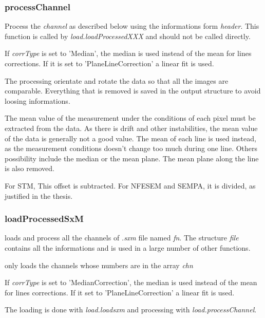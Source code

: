 \subsubsection{processChannel}

\bdf
{} Process the \emph{channel} as described below using the informations form \emph{header}. This function is called by \emph{load.loadProcessedXXX} and should not be called directly.

 If \emph{corrType} is set to 'Median', the median is used instead of the mean for lines corrections. If it is set to 'PlaneLineCorrection' a linear fit is used.  
\edf

The processing orientate and rotate the data so that all the images are comparable.
Everything that is removed is saved in the output structure to avoid loosing informations.

The mean value of the measurement under the conditions of each pixel must be extracted from the data. As there is drift and other instabilities, the mean value of the data is generally not a good value. The mean of each line is used instead, as the measurement conditions doesn't change too much during one line. Others possibility include the median or the mean plane. The mean plane along the line is also removed.

For STM, This offset is subtracted. For NFESEM and SEMPA, it is divided, as justified in the thesis.
\subsubsection{loadProcessedSxM}
\bdf
{} loads and process all the channels of \emph{.sxm} file named \emph{fn}. The structure \emph{file} contains all the informations and is used in a large number of other functions.

 only loads the channels whose numbers are in the array \emph{chn}

 If \emph{corrType} is set to 'MedianCorrection', the median is used instead of the mean for lines corrections. If it set to 'PlaneLineCorrection' a linear fit is used. 

\edf

The loading is done with \emph{load.loadsxm} and processing with \emph{load.processChannel}.

